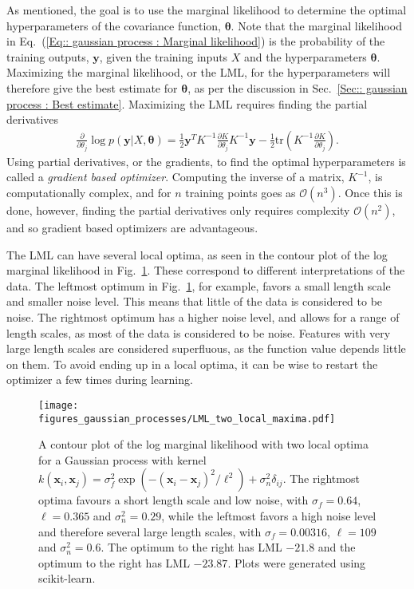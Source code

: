 \documentclass[twoside,english]{uiofysmaster}
\begin{document}
As mentioned, the goal is to use the marginal likelihood to determine the optimal hyperparameters of the covariance function, $\boldsymbol{\theta}$. Note that the marginal likelihood in Eq.~(\ref{Eq:: gaussian process : Marginal likelihood}) is the probability of the training outputs, $\textbf{y}$, given the training inputs $X$ and the hyperparameters $\boldsymbol{\theta}$. Maximizing the marginal likelihood, or the LML, for the hyperparameters will therefore give the best estimate for $\boldsymbol{\theta}$, as per the discussion in Sec.~\ref{Sec:: gaussian process : Best estimate}. Maximizing the LML requires finding the partial derivatives 
\begin{align}
\frac{\partial}{\partial \theta_j}
 \log p(\textbf{y}|X, \boldsymbol{\theta}) = \frac{1}{2} \textbf{y}^T K^{-1} \frac{\partial K}{\partial \theta_j} K^{-1} \textbf{y} - \frac{1}{2} \text{tr} (K^{-1} \frac{\partial K}{\partial \theta_j}).
\end{align}
Using partial derivatives, or the gradients, to find the optimal hyperparameters is called a \textit{gradient based optimizer}. Computing the inverse of a matrix, $K^{-1}$, is computationally complex, and for $n$ training points goes as $\mathcal{O}(n^3)$. Once this is done, however, finding the partial derivatives only requires complexity $\mathcal{O}(n^2)$, and so gradient based optimizers are advantageous.

The LML can have several local optima, as seen in the contour plot of the log marginal likelihood in Fig.~\ref{Fig:: gaussian process : LML several local optima}. These correspond to different interpretations of the data. The leftmost optimum in Fig.~\ref{Fig:: gaussian process : LML several local optima}, for example, favors a small length scale and smaller noise level. This means that little of the data is considered to be noise. The rightmost optimum has a higher noise level, and allows for a range of length scales, as most of the data is considered to be noise. Features with very large length scales are considered superfluous, as the function value depends little on them. To avoid ending up in a local optima, it can be wise to restart the optimizer a few times during learning.

\begin{figure}
\centering
\texttt{[image: figures\_gaussian\_processes/LML\_two\_local\_maxima.pdf]}
\caption{A contour plot of the log marginal likelihood with two local optima for a Gaussian process with kernel $k(\textbf{x}_i, \textbf{x}_j) = \sigma_f^2 \exp(- (\textbf{x}_i - \textbf{x}_j)^2 / \ell^2) + \sigma_n^2 \delta_{ij}$. The rightmost optima favours a short length scale and low noise, with $\sigma_f = 0.64$, $\ell = 0.365$ and $\sigma^2_n = 0.29$, while the leftmost favors a high noise level and therefore several large length scales, with $\sigma_f = 0.00316$, $\ell = 109$ and $\sigma^2_n = 0.6$. The optimum to the right has LML $-21.8$ and the optimum to the right has LML $-23.87$. Plots were generated using scikit-learn.}
\label{Fig:: gaussian process : LML several local optima}
\end{figure}
\end{document}
